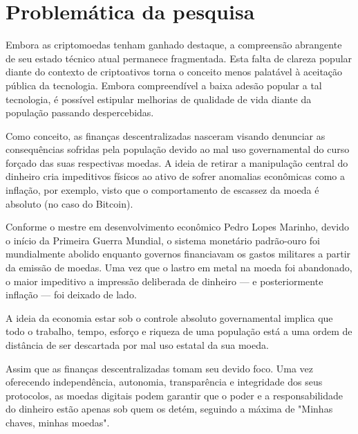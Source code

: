 \chapter{Problemática da pesquisa}



Embora as criptomoedas tenham ganhado destaque, a compreensão abrangente de seu estado técnico atual permanece fragmentada. Esta falta de clareza popular diante do contexto de criptoativos torna o conceito menos palatável à aceitação pública da tecnologia. Embora compreendível a baixa adesão popular a tal tecnologia, é possível estipular melhorias de qualidade de vida diante da população passando despercebidas.

Como conceito, as finanças descentralizadas nasceram visando denunciar as consequências sofridas pela população devido ao mal uso governamental do curso forçado das suas respectivas moedas. A ideia de retirar a manipulação central do dinheiro cria impeditivos físicos ao ativo de sofrer anomalias econômicas como a inflação, por exemplo, visto que o comportamento de escassez da moeda é absoluto (no caso do Bitcoin).

Conforme o mestre em desenvolvimento econômico Pedro Lopes Marinho, devido o início da Primeira Guerra Mundial, o sistema monetário padrão-ouro foi mundialmente abolido enquanto governos financiavam os gastos militares a partir da emissão de moedas. Uma vez que o lastro em metal na moeda foi abandonado, o maior impeditivo a impressão deliberada de dinheiro — e posteriormente inflação — foi deixado de lado.

A ideia da economia estar sob o controle absoluto governamental implica que todo o trabalho, tempo, esforço e riqueza de uma população está a uma ordem de distância de ser descartada por mal uso estatal da sua moeda. 

Assim que as finanças descentralizadas tomam seu devido foco. Uma vez oferecendo independência, autonomia, transparência e integridade dos seus protocolos, as moedas digitais podem garantir que o poder e a responsabilidade do dinheiro estão apenas sob quem os detém, seguindo a máxima de "Minhas chaves, minhas moedas".
